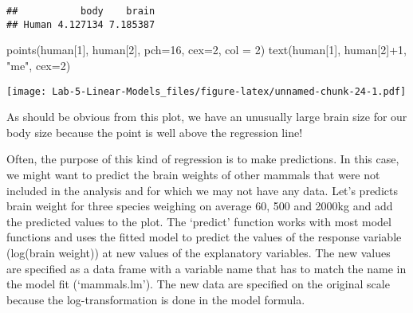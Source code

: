 \documentclass[
]{article}
\newenvironment{Shaded}{\begin{snugshade}}{\end{snugshade}}
\newcommand{\AttributeTok}[1]{\textcolor[rgb]{0.77,0.63,0.00}{#1}}
\newcommand{\CommentTok}[1]{\textcolor[rgb]{0.56,0.35,0.01}{\textit{#1}}}
\newcommand{\DecValTok}[1]{\textcolor[rgb]{0.00,0.00,0.81}{#1}}
\newcommand{\FunctionTok}[1]{\textcolor[rgb]{0.00,0.00,0.00}{#1}}
\newcommand{\NormalTok}[1]{#1}
\newcommand{\OtherTok}[1]{\textcolor[rgb]{0.56,0.35,0.01}{#1}}
\newcommand{\SpecialCharTok}[1]{\textcolor[rgb]{0.00,0.00,0.00}{#1}}
\newcommand{\StringTok}[1]{\textcolor[rgb]{0.31,0.60,0.02}{#1}}
\begin{document}
\begin{verbatim}
##           body    brain
## Human 4.127134 7.185387
\end{verbatim}

\begin{Shaded}
\begin{Highlighting}[]
\FunctionTok{points}\NormalTok{(human[}\DecValTok{1}\NormalTok{], human[}\DecValTok{2}\NormalTok{], }\AttributeTok{pch=}\DecValTok{16}\NormalTok{, }\AttributeTok{cex=}\DecValTok{2}\NormalTok{, }\AttributeTok{col =} \DecValTok{2}\NormalTok{)}
\FunctionTok{text}\NormalTok{(human[}\DecValTok{1}\NormalTok{], human[}\DecValTok{2}\NormalTok{]}\SpecialCharTok{+}\DecValTok{1}\NormalTok{, }\StringTok{"me"}\NormalTok{, }\AttributeTok{cex=}\DecValTok{2}\NormalTok{)}
\end{Highlighting}
\end{Shaded}

\texttt{[image: Lab-5-Linear-Models\_files/figure-latex/unnamed-chunk-24-1.pdf]}

As should be obvious from this plot, we have an unusually large brain
size for our body size because the point is well above the regression
line!

Often, the purpose of this kind of regression is to make predictions. In
this case, we might want to predict the brain weights of other mammals
that were not included in the analysis and for which we may not have any
data. Let's predicts brain weight for three species weighing on average
60, 500 and 2000kg and add the predicted values to the plot. The
`predict' function works with most model functions and uses the fitted
model to predict the values of the response variable (log(brain weight))
at new values of the explanatory variables. The new values are specified
as a data frame with a variable name that has to match the name in the
model fit (`mammals.lm'). The new data are specified on the original
scale because the log-transformation is done in the model formula.

\begin{Shaded}
\end{Shaded}
\end{document}
